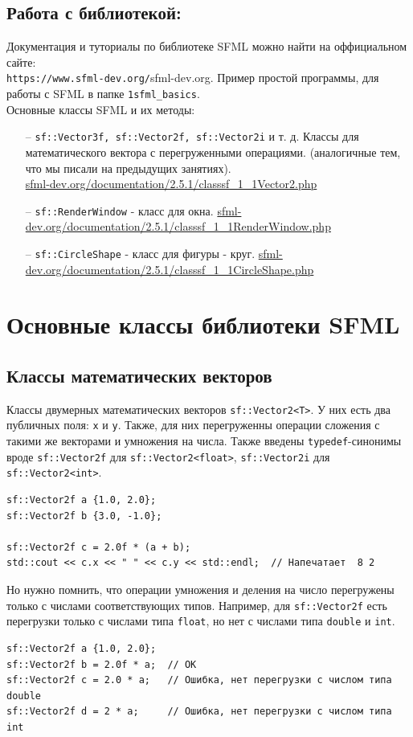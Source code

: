 \documentclass{article}
\begin{document}
\subsection*{Работа с библиотекой:}
Документация и туториалы по библиотеке SFML можно найти на оффициальном сайте:\\ \texttt{https://www.sfml-dev.org/}{sfml-dev.org}. Пример простой программы, для работы с SFML в папке \texttt{1sfml\_basics}. \\
Основные классы SFML и их методы:
\begin{itemize}
\item[--] \texttt{sf::Vector3f, sf::Vector2f, sf::Vector2i} и т. д. Классы для математического вектора с перегруженными операциями. (аналогичные тем, что мы писали на предыдущих занятиях). \\
\href{https://www.sfml-dev.org/documentation/2.5.1/classsf_1_1Vector2.php}{sfml-dev.org/documentation/2.5.1/classsf\_1\_1Vector2.php}
\item[--] \texttt{sf::RenderWindow} - класс для окна.
\href{https://www.sfml-dev.org/documentation/2.5.1/classsf_1_1RenderWindow.php}{sfml-dev.org/documentation/2.5.1/classsf\_1\_1RenderWindow.php}
\item[--] \texttt{sf::CircleShape} - класс для фигуры - круг.
\href{https://www.sfml-dev.org/documentation/2.5.1/classsf_1_1CircleShape.php}{sfml-dev.org/documentation/2.5.1/classsf\_1\_1CircleShape.php}
\end{itemize}
\fi


\newpage
\section{Основные классы библиотеки SFML}

\subsection*{Классы математических векторов}
Классы двумерных математических векторов \texttt{sf::Vector2<T>}. У них есть два публичных поля: \texttt{x} и \texttt{y}. Также, для них перегруженны операции сложения с такими же векторами и умножения на числа. Также введены \texttt{typedef}-синонимы вроде \texttt{sf::Vector2f} для \texttt{sf::Vector2<float>}, \texttt{sf::Vector2i} для \texttt{sf::Vector2<int>}.
\begin{lstlisting}
sf::Vector2f a {1.0, 2.0};
sf::Vector2f b {3.0, -1.0};

sf::Vector2f c = 2.0f * (a + b);
std::cout << c.x << " " << c.y << std::endl;  // Напечатает  8 2
\end{lstlisting}
Но нужно помнить, что операции умножения и деления на число перегружены только с числами соответствующих типов. Например, для \texttt{sf::Vector2f} есть перегрузки только с числами типа \texttt{float}, но нет с числами типа \texttt{double} и \texttt{int}.
\begin{lstlisting}
sf::Vector2f a {1.0, 2.0};
sf::Vector2f b = 2.0f * a;  // ОК
sf::Vector2f c = 2.0 * a;   // Ошибка, нет перегрузки с числом типа double
sf::Vector2f d = 2 * a;     // Ошибка, нет перегрузки с числом типа int
\end{lstlisting}
\end{document}
